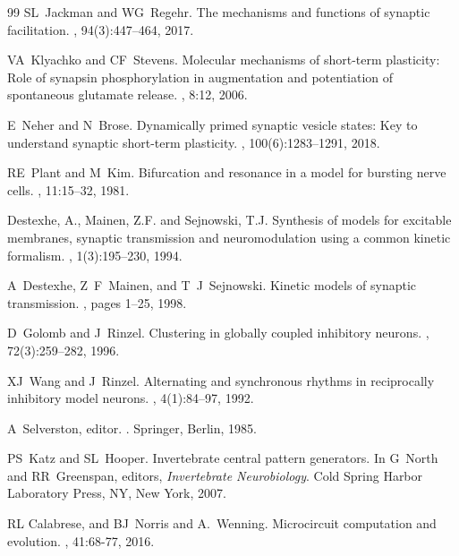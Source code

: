 \documentclass[nofootinbib,aip,amsmath,amssymb,reprint,twocolumn,10pt]{revtex4-2}
\begin{document}
\begin{thebibliography}{99}
SL~Jackman and WG~Regehr.
\newblock The mechanisms and functions of synaptic facilitation.
, 94(3):447--464, 2017.

VA~Klyachko and CF~Stevens.
\newblock Molecular mechanisms of short-term plasticity: Role of synapsin phosphorylation in augmentation and potentiation of spontaneous glutamate release.
, 8:12, 2006.

E~Neher and N~Brose.
\newblock Dynamically primed synaptic vesicle states: Key to understand synaptic short-term plasticity.
, 100(6):1283--1291, 2018.

RE~Plant and M~Kim.
\newblock Bifurcation and resonance in a model for bursting nerve cells.
, 11:15--32, 1981.

Destexhe, A., Mainen, Z.F. and Sejnowski, T.J.
\newblock Synthesis of models for excitable membranes, synaptic transmission and neuromodulation using a common kinetic formalism.
, 1(3):195--230, 1994.

A~Destexhe, Z~F~Mainen, and T~J~Sejnowski.
\newblock Kinetic models of synaptic transmission.
, pages 1--25, 1998.

D~Golomb and J~Rinzel.
\newblock Clustering in globally coupled inhibitory neurons.
, 72(3):259--282, 1996.


XJ~Wang and J~Rinzel.
\newblock Alternating and synchronous rhythms in reciprocally inhibitory model neurons.
, 4(1):84--97, 1992.


A~Selverston, editor.
.
\newblock Springer, Berlin, 1985.


PS~Katz and SL~Hooper.
\newblock Invertebrate central pattern generators.
\newblock In G~North and RR~Greenspan, editors, {\em Invertebrate
  Neurobiology}. Cold Spring Harbor Laboratory Press, NY, New York, 2007.
  
 RL Calabrese, and BJ~Norris and A.~Wenning.
\newblock Microcircuit computation and evolution.
,
  41:68-77, 2016. 
  

\end{thebibliography}
\end{document}
